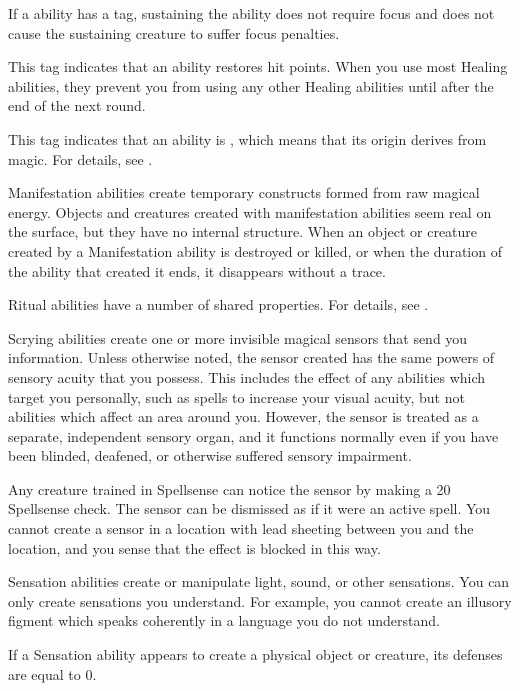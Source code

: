 If a  ability has a  tag, sustaining the ability does not require focus and does not cause the sustaining creature to suffer focus penalties.

 This tag indicates that an ability restores hit points.
When you use most Healing abilities, they prevent you from using any other Healing abilities until after the end of the next round.

 This tag indicates that an ability is , which means that its origin derives from magic.
For details, see .

 Manifestation abilities create temporary constructs formed from raw magical energy.
Objects and creatures created with manifestation abilities seem real on the surface, but they have no internal structure.
When an object or creature created by a Manifestation ability is destroyed or killed, or when the duration of the ability that created it ends, it disappears without a trace.

 Ritual abilities have a number of shared properties.
For details, see .

 Scrying abilities create one or more invisible magical sensors that send you information.
Unless otherwise noted, the sensor created has the same powers of sensory acuity that you possess.
This includes the effect of any abilities which target you personally, such as spells to increase your visual acuity, but not abilities which affect an area around you.
However, the sensor is treated as a separate, independent sensory organ, and it functions normally even if you have been blinded, deafened, or otherwise suffered sensory impairment.
\par Any creature trained in Spellsense can notice the sensor by making a  20 Spellsense check.
The sensor can be dismissed as if it were an active spell.
You cannot create a sensor in a location with lead sheeting between you and the location, and you sense that the effect is blocked in this way.

 Sensation abilities create or manipulate light, sound, or other sensations.
You can only create sensations you understand.
For example, you cannot create an illusory figment which speaks coherently in a language you do not understand.
\par If a Sensation ability appears to create a physical object or creature, its defenses are equal to 0.

